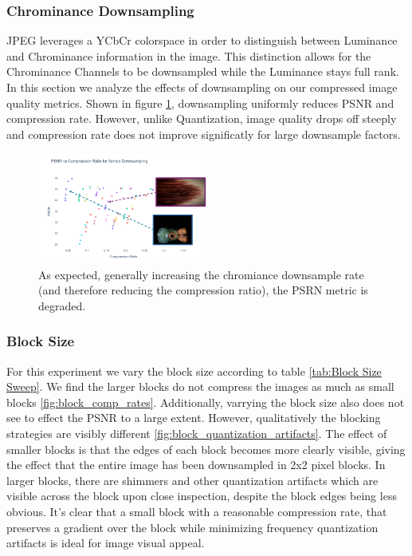 \subsubsection{Chrominance Downsampling}

JPEG leverages a YCbCr colorspace in order to distinguish between Luminance and Chrominance information in the image.
This distinction allows for the Chrominance Channels to be downsampled while the Luminance stays full rank.
In this section we analyze the effects of downsampling on our compressed image quality metrics. 
Shown in figure \ref{fig:downsample_vs_psnr}, downsampling uniformly reduces PSNR and compression rate. However, unlike Quantization, image quality drops off steeply and compression rate does not improve significatly for large downsample factors.

\begin{figure}
    \includegraphics[width=0.5\textwidth]{assets/PSNR vs Chromiance Downsampling with Images.png}
    \caption{As expected, generally increasing the chromiance downsample rate (and therefore reducing the compression ratio), the PSRN metric is degraded.}
    \label{fig:downsample_vs_psnr}
\end{figure}

\subsubsection{Block Size}

For this experiment we vary the block size according to table \ref{tab:Block Size Sweep}. We find the larger blocks do not compress the images as much as small blocks \ref{fig:block_comp_rates}. Additionally, varrying the block size also does not see to effect the PSNR to a large extent. However, qualitatively the blocking strategies are visibly different \ref{fig:block_quantization_artifacts}. The effect of smaller blocks is that the edges of each block becomes more clearly visible, giving the effect that the entire image has been downsampled in 2x2 pixel blocks. In larger blocks, there are shimmers and other quantization artifacts which are visible across the block upon close inspection, despite the block edges being less obvious. It's clear that a small block with a reasonable compression rate, that preserves a gradient over the block while minimizing frequency quantization artifacts is ideal for image visual appeal.

